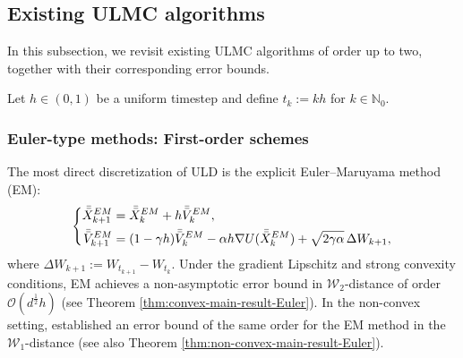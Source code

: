 \documentclass[12pt]{article}
\numberwithin{equation}{section}
\begin{document}
\subsection{Existing ULMC algorithms}


In this subsection, we revisit existing ULMC algorithms of order up to two, together with their corresponding error bounds. 

Let $h\in(0,1)$ be a uniform timestep and define
$t_k:=kh$ for $k\in\mathbb{N}_0$.


\subsubsection{Euler-type methods: First-order schemes}

The most direct discretization of ULD is the explicit
Euler--Maruyama method (EM):
\begin{equation}
\label{eq:intro-EM}
\left\{
\begin{aligned}
    \Bar{\Bar{X}}_{k+1}^{EM}
    &=
    \Bar{\Bar{X}}_{k}^{EM}
    +
    h\Bar{\Bar{V}}_{k}^{EM},
    \\
    \Bar{\Bar{V}}_{k+1}^{EM}
    &=
    (1-\gamma h)\Bar{\Bar{V}}_{k}^{EM}
    -
    \alpha h
    \nabla U(\Bar{\Bar{X}}_{k}^{EM})
    +
    \sqrt{2\gamma\alpha}\,
    \Delta W_{k+1},
\end{aligned}
\right.
\end{equation}
where
\(
    \Delta W_{k+1}
    :=
    W_{t_{k+1}}-W_{t_k}
    .
\)
%
Under the gradient Lipschitz and strong convexity  conditions, EM achieves a non-asymptotic error bound in $\mathcal W_2$-distance of order $\mathcal O(d^{\frac{1}{2}}h)$ (see Theorem \ref{thm:convex-main-result-Euler}).
In the non-convex setting, \cite{schuh2024convergence} established an error bound of the same order for the EM method in the \(\mathcal W_1\)-distance (see also Theorem \ref{thm:non-convex-main-result-Euler}). 
\end{document}
